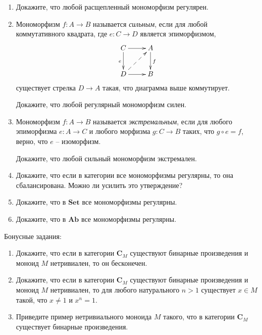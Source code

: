 \documentclass[draft]{article}
\newcommand{\cat}[1]{\mathbf{#1}}
\renewcommand{\C}{\cat{C}}
\newcommand{\Set}{\cat{Set}}
\newcommand{\Ab}{\cat{Ab}}
\begin{document}
\begin{enumerate}
\item Докажите, что любой расщепленный мономорфизм регулярен.

\item Мономорфизм $f : A \to B$ называется \emph{сильным}, если для любой коммутативного квадрата, где $e : C \to D$ является эпиморфизмом,
\[ \xymatrix{ C \ar[r] \ar[d]_e      & A \ar[d]^f \\
              D \ar[r] \ar@{-->}[ur] & B
            } \]
существует стрелка $D \to A$ такая, что диаграмма выше коммутирует.

Докажите, что любой регулярный мономорфизм силен.

\item Мономорфизм $f : A \to B$ называется \emph{экстремальным}, если для любого эпиморфизма $e : A \to C$ и любого морфизма $g : C \to B$ таких, что $g \circ e = f$, верно, что $e$ -- изоморфизм.

Докажите, что любой сильный мономорфизм экстремален.

\item Докажите, что если в категории все мономорфизмы регулярны, то она сбалансирована. Можно ли усилить это утверждение?

\item Докажите, что в $\Set$ все мономорфизмы регулярны.

\item Докажите, что в $\Ab$ все мономорфизмы регулярны.

\end{enumerate}

Бонусные задания:

\begin{enumerate}

\item Докажите, что если в категории $\C_M$ существуют бинарные произведения и моноид $M$ нетривиален, то он бесконечен.

\item Докажите, что если в категории $\C_M$ существуют бинарные произведения и моноид $M$ нетривиален, то для любого натурального $n > 1$ существует $x \in M$ такой, что $x \neq 1$ и $x^n = 1$.

\item Приведите пример нетривиального моноида $M$ такого, что в категории $\C_M$ существует бинарные произведения.

\end{enumerate}
\end{document}
